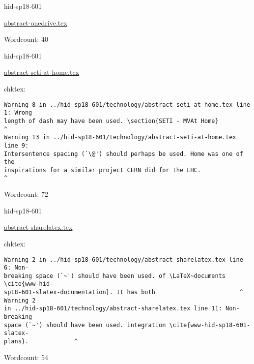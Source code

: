 

\begin{IU}

hid-sp18-601

\href{https://github.com/cloudmesh-community/hid-sp18-601/blob/master//technology/abstract-onedrive.tex}{abstract-onedrive.tex}

 

Wordcount: 40

\end{IU}



\begin{IU}

hid-sp18-601

\href{https://github.com/cloudmesh-community/hid-sp18-601/blob/master//technology/abstract-seti-at-home.tex}{abstract-seti-at-home.tex}

 
chktex:
\begin{tiny}
\begin{verbatim}
Warning 8 in ../hid-sp18-601/technology/abstract-seti-at-home.tex line 1: Wrong
length of dash may have been used. \section{SETI - MVAt Home}                  ^
Warning 13 in ../hid-sp18-601/technology/abstract-seti-at-home.tex line 9:
Intersentence spacing (`\@') should perhaps be used. Home was one of the
inspirations for a similar project CERN did for the LHC.
^
\end{verbatim}
\end{tiny}

Wordcount: 72

\end{IU}



\begin{IU}

hid-sp18-601

\href{https://github.com/cloudmesh-community/hid-sp18-601/blob/master//technology/abstract-sharelatex.tex}{abstract-sharelatex.tex}

 
chktex:
\begin{tiny}
\begin{verbatim}
Warning 2 in ../hid-sp18-601/technology/abstract-sharelatex.tex line 6: Non-
breaking space (`~') should have been used. of \LaTeX~documents \cite{www-hid-
sp18-601-slatex-documentation}. It has both                        ^ Warning 2
in ../hid-sp18-601/technology/abstract-sharelatex.tex line 11: Non-breaking
space (`~') should have been used. integration \cite{www-hid-sp18-601-slatex-
plans}.             ^
\end{verbatim}
\end{tiny}

Wordcount: 54

\end{IU}

